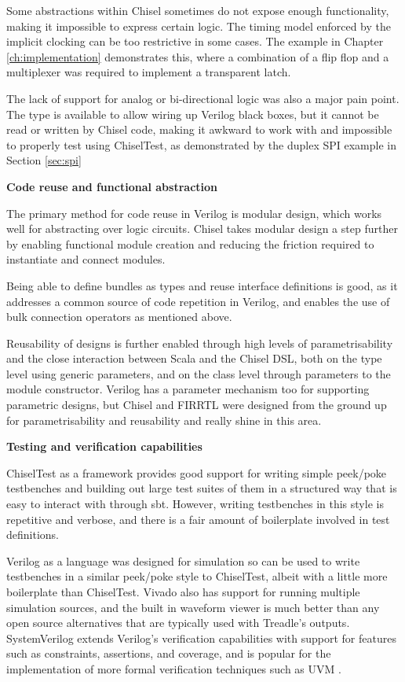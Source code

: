 Some abstractions within Chisel sometimes do not expose enough functionality, making it impossible to express certain logic. The timing model enforced by the implicit clocking can be too restrictive in some cases. The example in Chapter \ref{ch:implementation} demonstrates this, where a combination of a flip flop and a multiplexer was required to implement a transparent latch.

The lack of support for analog or bi-directional logic was also a major pain point. The  type is available to allow wiring up Verilog black boxes, but it cannot be read or written by Chisel code, making it awkward to work with and impossible to properly test using ChiselTest, as demonstrated by the duplex SPI example in Section \ref{sec:spi}

\textbf{Code reuse and functional abstraction}

The primary method for code reuse in Verilog is modular design, which works well for abstracting over logic circuits. Chisel takes modular design a step further by enabling functional module creation and reducing the friction required to instantiate and connect modules.

Being able to define bundles as types and reuse interface definitions is good, as it addresses a common source of code repetition in Verilog, and enables the use of bulk connection operators as mentioned above.

Reusability of designs is further enabled through high levels of parametrisability and the close interaction between Scala and the Chisel DSL, both on the type level using generic parameters, and on the class level through parameters to the module constructor. Verilog has a parameter mechanism too for supporting parametric designs, but Chisel and FIRRTL were designed from the ground up for parametrisability and reusability \cite{chisel, firrtl} and really shine in this area.

\textbf{Testing and verification capabilities}

ChiselTest as a framework provides good support for writing simple peek/poke testbenches and building out large test suites of them in a structured way that is easy to interact with through sbt. However, writing testbenches in this style is repetitive and verbose, and there is a fair amount of boilerplate involved in test definitions.

Verilog as a language was designed for simulation so can be used to write testbenches in a similar peek/poke style to ChiselTest, albeit with a little more boilerplate than ChiselTest. Vivado also has support for running multiple simulation sources, and the built in waveform viewer is much better than any open source alternatives that are typically used with Treadle's outputs. SystemVerilog extends Verilog's verification capabilities with support for features such as constraints, assertions, and coverage, and is popular for the implementation of more formal verification techniques such as UVM \cite{spear_tumbush_2012,uvm}.

